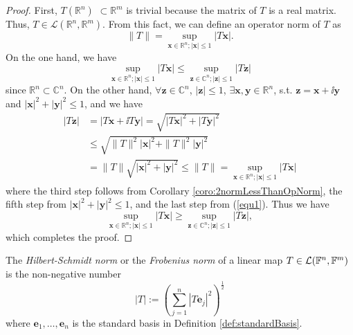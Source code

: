\begin{proof}
  First, $T(\mathbb{R}^n)$ $\subset \mathbb{R}^m$ is trivial because the matrix of $T$ is a real matrix.
  Thus, $T \in \mathcal{L}(\mathbb{R}^n, \mathbb{R}^m)$. From this fact, we can define an operator norm of $T$ as
  \begin{equation}\label{equ1}
    \|T\| = \underset{\mathbf{x}\in \mathbb{R}^n;|\mathbf{x}| \leq 1}{\sup}|T\mathbf{x}|.
  \end{equation}
  On the one hand, we have
  \begin{equation}\nonumber
    \underset{\mathbf{x}\in \mathbb{R}^n;|\mathbf{x}| \leq 1}{\sup}|T\mathbf{x}| \leq \underset{\mathbf{z}\in \mathbb{C}^n;|\mathbf{z}| \leq 1}{\sup}|T\mathbf{z}|
  \end{equation}
  since $\mathbb{R}^n \subset \mathbb{C}^n$. 
  On the other hand,
  $\forall \mathbf{z} \in \mathbb{C}^n$,
  $|\mathbf{z}| \leq 1$,
  $\exists \mathbf{x},\mathbf{y} \in \mathbb{R}^n$,
  s.t. $\mathbf{z} = \mathbf{x} + \ii \mathbf{y}$
  and $|\mathbf{x}|^2 + |\mathbf{y}|^2 \leq 1$, and we have
  \begin{align*}
    |T\mathbf{z}| &= |T\mathbf{x} + \ii T\mathbf{y}| =
                    \sqrt{|T\mathbf{x}|^2 + |T\mathbf{y}|^2}
    \\
                  &\le \sqrt{\|T\|^2|\mathbf{x}|^2 + \|T\|^2|\mathbf{y}|^2}
    \\
    &= \|T\|\sqrt{|\mathbf{x}|^2 + |\mathbf{y}|^2} \leq \|T\| = \underset{\mathbf{x}\in \mathbb{R}^n;|\mathbf{x}| \leq 1}{\sup}|T\mathbf{x}|  
  \end{align*}
  \noindent where the third step follows from Corollary
  \ref{coro:2normLessThanOpNorm}, 
  the fifth step from $|\mathbf{x}|^2 + |\mathbf{y}|^2 \leq 1$, and
  the last step from (\ref{equ1}). Thus we have
  \begin{displaymath}
    \underset{\mathbf{x}\in \mathbb{R}^n;
      |\mathbf{x}| \leq 1}{\sup}|T\mathbf{x}| \geq
    \underset{\mathbf{z}\in \mathbb{C}^n;
      |\mathbf{z}| \leq 1}{\sup}|T\mathbf{z}|,
  \end{displaymath}
  which completes the proof.
\end{proof}

\begin{defn}
  \label{def:HilbertSchmidtNorm}
  The \emph{Hilbert-Schmidt norm} or the \emph{Frobenius norm}
  of a linear map
  \mbox{$T\in {\cal L}(\mathbb{F}^n,\mathbb{F}^m)$}
  is the non-negative number 
  \begin{equation}
    \label{eq:HilbertSchmidtNorm}
    |T| := \left(
      \sum_{j=1}^n \left|T \mathbf{e}_j\right|^2
    \right)^{\frac{1}{2}}
  \end{equation}
  where $\mathbf{e}_1, \ldots, \mathbf{e}_n$
  is the standard basis %
  in Definition \ref{def:standardBasis}.
\end{defn}

